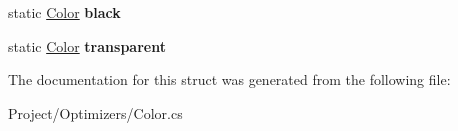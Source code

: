 \begin{DoxyCompactItemize}
\item 
\mbox{\label{struct_lerp2_a_p_i_1_1_optimizers_1_1_color_ad91fc9917cf1cf0f62a5347dc02db2e4}} 
static \hyperlink{struct_lerp2_a_p_i_1_1_optimizers_1_1_color}{Color} {\bfseries black}
\item 
\mbox{\label{struct_lerp2_a_p_i_1_1_optimizers_1_1_color_a015eccfb9ba8a84a77f63da640ed0735}} 
static \hyperlink{struct_lerp2_a_p_i_1_1_optimizers_1_1_color}{Color} {\bfseries transparent}
\end{DoxyCompactItemize}


The documentation for this struct was generated from the following file\+:\begin{DoxyCompactItemize}
\item 
Project/\+Optimizers/Color.\+cs\end{DoxyCompactItemize}
